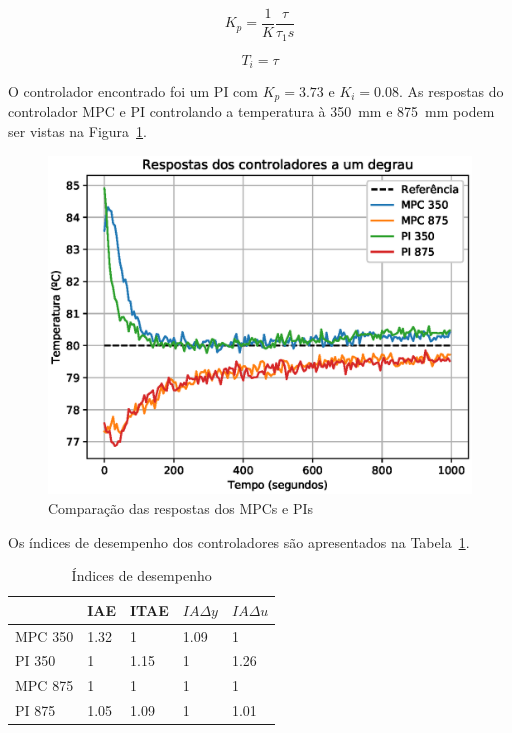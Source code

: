 \begin{equation}
	\label{eq:pi-ds-gain}
	K_p = \frac{1}{K}\frac{\tau}{\tau_{1}s}
\end{equation}

\begin{equation}
	\label{eq:pi-ds-ti}
	T_i = \tau
\end{equation}

O controlador encontrado foi um PI com \(K_p=3.73\) e \(K_i=0.08\). As respostas
do controlador MPC e PI controlando a temperatura à \SI{350}{\milli\metre} e
\SI{875}{\milli\metre} podem ser vistas na Figura~\ref{fig:comparacao}.

\begin{figure}[ht!]
	\centering
	\captionsetup{justification=centering}
	\includegraphics[height=0.5\linewidth]{imgs/comparacao}
	\caption{Comparação das respostas dos MPCs e PIs}%
	\label{fig:comparacao}
\end{figure}

Os índices de desempenho dos controladores são apresentados na
Tabela~\ref{tbl:indexes}.

\begin{table}[ht!]
	\centering
	\caption{Índices de desempenho}%
	\label{tbl:indexes}
	\begin{tabular}{@{}lllll@{}}
				& IAE  & ITAE & \(IA\Delta{}y\) & \(IA\Delta{}u\) \\ \toprule
		MPC 350 & 1.32 & 1    & 1.09            & 1               \\ 
		PI 350  & 1    & 1.15 & 1               & 1.26            \\ \midrule
		MPC 875 & 1    & 1    & 1               & 1               \\ 
		PI 875  & 1.05 & 1.09 & 1               & 1.01            \\ \bottomrule
	\end{tabular}
\end{table}

